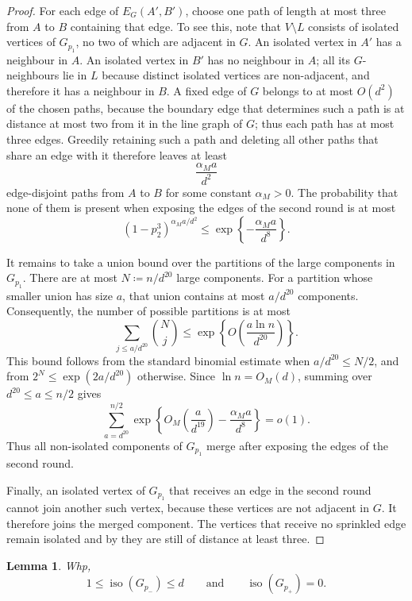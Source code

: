 \documentclass[notitlepage]{scrartcl}
\newtheorem{lemma}[thm]{Lemma}
\newcommand{\iso}{\operatorname{iso}}
\begin{document}
\begin{proof}
For each edge of $E_G(A',B')$, choose one path of length at most three from $A$ to $B$ containing that edge.
To see this, note that $V\setminus L$ consists of isolated vertices of $G_{p_1}$, no two of which are adjacent in $G$.
An isolated vertex in $A'$ has a neighbour in $A$.
An isolated vertex in $B'$ has no neighbour in $A$; all its $G$-neighbours lie in $L$ because distinct isolated vertices are non-adjacent, and therefore it has a neighbour in $B$.
A fixed edge of $G$ belongs to at most $O(d^2)$ of the chosen paths, because the boundary edge that determines such a path is at distance at most two from it in the line graph of $G$; thus each path has at most three edges.
Greedily retaining such a path and deleting all other paths that share an edge with it therefore leaves at least
\[
  \frac{\alpha_M a}{d^2}
\]
edge-disjoint paths from $A$ to $B$ for some constant $\alpha_M>0$.
The probability that none of them is present when exposing the edges of the second round is at most
\[
  (1-p_2^3)^{\alpha_Ma/d^2}\le \exp\left\{-\frac{\alpha_Ma}{d^8}\right\}.
\]

It remains to take a union bound over the partitions of the large components in $G_{p_1}$. There are at most $N\coloneqq n/d^{20}$ large components.
For a partition whose smaller union has size $a$, that union contains at most $a/d^{20}$ components.
Consequently, the number of possible partitions is at most
\[
  \sum_{j\le a/d^{20}}\binom{N}{j}
  \le \exp\left\{O\left(\frac{a\ln n}{d^{20}}\right)\right\}.
\]
This bound follows from the standard binomial estimate when $a/d^{20}\le N/2$, and from $2^N\le\exp(2a/d^{20})$ otherwise.
Since $\ln n=O_M(d)$, summing over $d^{20}\le a\le n/2$ gives
\[
  \sum_{a=d^{20}}^{n/2}
  \exp\left\{O_M\left(\frac{a}{d^{19}}\right)-\frac{\alpha_Ma}{d^8}\right\}=o(1).
\]
Thus all non-isolated components of $G_{p_1}$ merge after exposing the edges of the second round.

Finally, an isolated vertex of $G_{p_1}$ that receives an edge in the second round cannot join another such vertex, because these vertices are not adjacent in $G$.
It therefore joins the merged component.
The vertices that receive no sprinkled edge remain isolated and by  they are still of distance at least three.
\end{proof}

\begin{lemma}\label{lem:number-isolates}
Whp,
\[
  1\le \iso(G_{p_-})\le d
  \qquad\text{and}\qquad
  \iso(G_{p_+})=0.
\]
\end{lemma}
\end{document}
